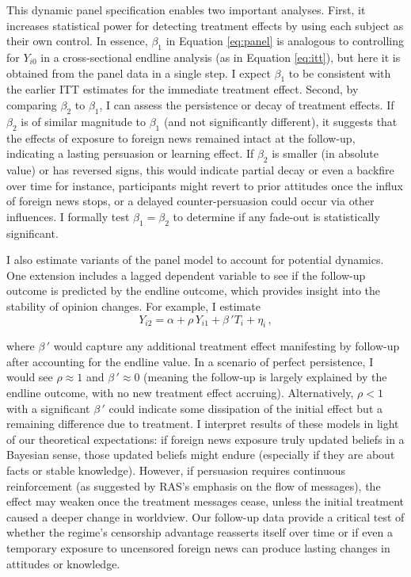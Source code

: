 \documentclass[12pt, american]{article}
\begin{document}
This dynamic panel specification enables two important analyses. First, it increases statistical power for detecting treatment effects by using each subject as their own control. In essence, $\beta_1$ in Equation \eqref{eq:panel} is analogous to controlling for $Y_{i0}$ in a cross-sectional endline analysis (as in Equation \eqref{eq:itt}), but here it is obtained from the panel data in a single step. I expect $\beta_1$ to be consistent with the earlier ITT estimates for the immediate treatment effect. Second, by comparing $\beta_2$ to $\beta_1$, I can assess the persistence or decay of treatment effects. If $\beta_2$ is of similar magnitude to $\beta_1$ (and not significantly different), it suggests that the effects of exposure to foreign news remained intact at the follow-up, indicating a lasting persuasion or learning effect. If $\beta_2$ is smaller (in absolute value) or has reversed signs, this would indicate partial decay or even a backfire over time for instance, participants might revert to prior attitudes once the influx of foreign news stops, or a delayed counter-persuasion could occur via other influences. I formally test $\beta_1 = \beta_2$ to determine if any fade-out is statistically significant.

I also estimate variants of the panel model to account for potential dynamics. One extension includes a lagged dependent variable to see if the follow-up outcome is predicted by the endline outcome, which provides insight into the stability of opinion changes. For example, I estimate 
\begin{equation}
     Y_{i2} = \alpha + \rho\,Y_{i1} + \beta\,' T_i + \eta_i\,, 
\end{equation}

where $\beta\,'$ would capture any additional treatment effect manifesting by follow-up after accounting for the endline value. In a scenario of perfect persistence, I would see $\rho \approx 1$ and $\beta\,' \approx 0$ (meaning the follow-up is largely explained by the endline outcome, with no new treatment effect accruing). Alternatively, $\rho<1$ with a significant $\beta\,'$ could indicate some dissipation of the initial effect but a remaining difference due to treatment. I interpret results of these models in light of our theoretical expectations: if foreign news exposure truly updated beliefs in a Bayesian sense, those updated beliefs might endure (especially if they are about facts or stable knowledge). However, if persuasion requires continuous reinforcement (as suggested by RAS's emphasis on the flow of messages), the effect may weaken once the treatment messages cease, unless the initial treatment caused a deeper change in worldview. Our follow-up data provide a critical test of whether the regime’s censorship advantage reasserts itself over time or if even a temporary exposure to uncensored foreign news can produce lasting changes in attitudes or knowledge.
\end{document}
